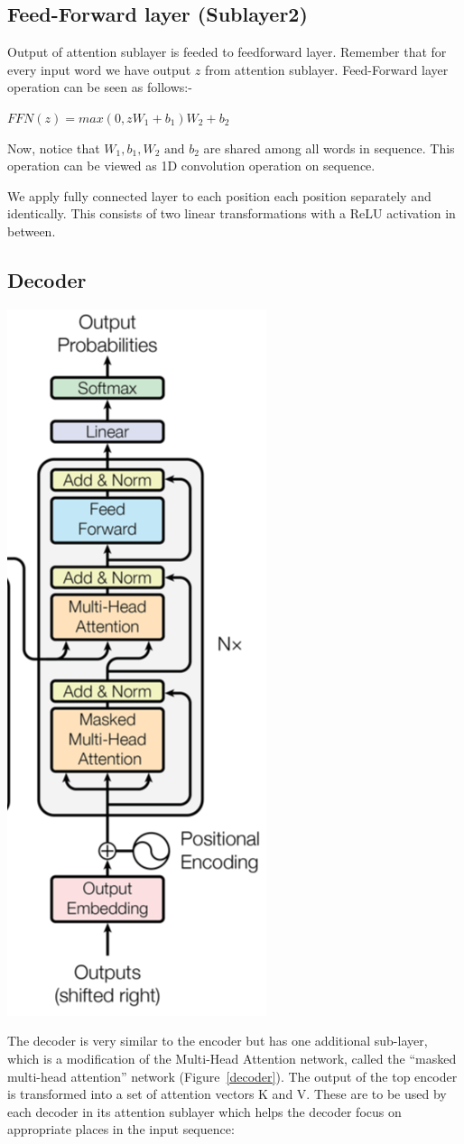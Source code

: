 \documentclass{article}
\begin{document}
\begin{multicols}{2}
\subsection{Feed-Forward layer (Sublayer2)}
Output of attention sublayer is feeded to feedforward layer. Remember that for every input word we have output $z$ from attention sublayer. Feed-Forward layer operation can be seen as follows:- 

\begin{center}
$FFN(z) = max(0, zW_1 + b_1)W_2 + b_2$
\end{center}

\noindent Now, notice that $W_1, b_1,W_2 \text{ and } b_2$  are shared among all words in sequence. This operation can be viewed as 1D convolution operation on sequence.

\noindent We apply fully connected layer to each position each position separately and identically. This consists of two linear transformations with a ReLU activation in between.

\subsection{Decoder}

\begin{center}
        \captionsetup{type=figure}
        \includegraphics[height=.65\textwidth , width=.40\textwidth]{decoder.png}
        \label{decoder}
\end{center}
The decoder is very similar to the encoder but has one additional sub-layer, which is a modification of the Multi-Head Attention network, called the “masked multi-head attention” network (Figure~\ref{decoder}).
The output of the top encoder is transformed into a set of attention vectors K and V. These are to be used by each decoder in its attention sublayer which helps the decoder focus on appropriate places in the input sequence:

\end{multicols}
\end{document}

